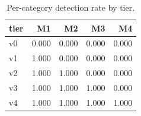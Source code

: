 \begin{table}[t]
\centering
\caption{Per-category detection rate by tier.}
\label{tab:category_dr}
\begin{tabular}{lrrrr}
\toprule
tier & M1 & M2 & M3 & M4 \\
\midrule
v0 & 0.000 & 0.000 & 0.000 & 0.000 \\
v1 & 1.000 & 0.000 & 0.000 & 0.000 \\
v2 & 1.000 & 1.000 & 0.000 & 0.000 \\
v3 & 1.000 & 1.000 & 1.000 & 0.000 \\
v4 & 1.000 & 1.000 & 1.000 & 1.000 \\
\bottomrule
\end{tabular}
\end{table}